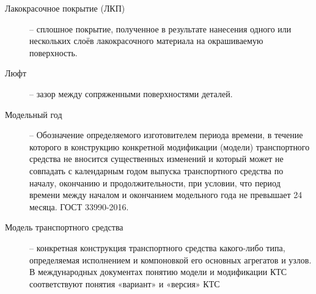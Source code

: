 \begin{description}
	\item
	[Лакокрасочное покрытие (ЛКП)] -- сплошное покрытие, полученное в результате нанесения 	одного или нескольких слоёв лакокрасочного материала на окрашиваемую поверхность.
\item
[Люфт] -- зазор между сопряженными поверхностями деталей.	
\item[Модельный год] -- Обозначение определяемого изготовителем периода времени, в течение которого в конструкцию конкретной модификации (модели) транспортного средства не вносится существенных изменений и который может не совпадать с календарным годом выпуска транспортного средства по началу, окончанию и продолжительности, при условии, что период времени между началом и окончанием модельного года не превышает 24 месяца. ГОСТ 33990-2016.
\item
[Модель транспортного средства] -- конкретная конструкция транспортного средства какого-либо типа, определяемая исполнением и компоновкой его
основных агрегатов и узлов. В международных документах понятию модели и
модификации КТС соответствуют понятия «вариант» и «версия» КТС



\end{description}
